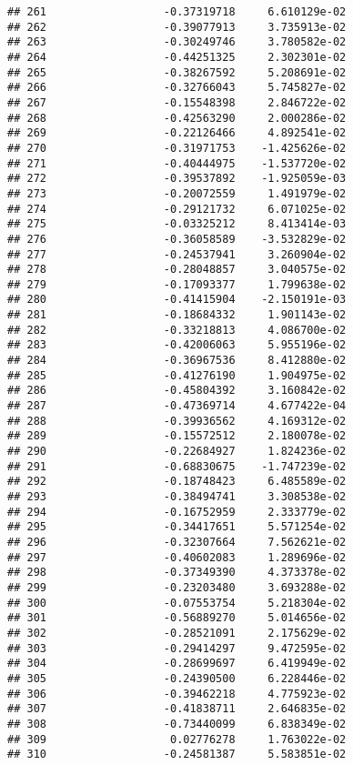 \documentclass[
]{article}
\begin{document}
\begin{verbatim}
## 261                  -0.37319718     6.610129e-02
## 262                  -0.39077913     3.735913e-02
## 263                  -0.30249746     3.780582e-02
## 264                  -0.44251325     2.302301e-02
## 265                  -0.38267592     5.208691e-02
## 266                  -0.32766043     5.745827e-02
## 267                  -0.15548398     2.846722e-02
## 268                  -0.42563290     2.000286e-02
## 269                  -0.22126466     4.892541e-02
## 270                  -0.31971753    -1.425626e-02
## 271                  -0.40444975    -1.537720e-02
## 272                  -0.39537892    -1.925059e-03
## 273                  -0.20072559     1.491979e-02
## 274                  -0.29121732     6.071025e-02
## 275                  -0.03325212     8.413414e-03
## 276                  -0.36058589    -3.532829e-02
## 277                  -0.24537941     3.260904e-02
## 278                  -0.28048857     3.040575e-02
## 279                  -0.17093377     1.799638e-02
## 280                  -0.41415904    -2.150191e-03
## 281                  -0.18684332     1.901143e-02
## 282                  -0.33218813     4.086700e-02
## 283                  -0.42006063     5.955196e-02
## 284                  -0.36967536     8.412880e-02
## 285                  -0.41276190     1.904975e-02
## 286                  -0.45804392     3.160842e-02
## 287                  -0.47369714     4.677422e-04
## 288                  -0.39936562     4.169312e-02
## 289                  -0.15572512     2.180078e-02
## 290                  -0.22684927     1.824236e-02
## 291                  -0.68830675    -1.747239e-02
## 292                  -0.18748423     6.485589e-02
## 293                  -0.38494741     3.308538e-02
## 294                  -0.16752959     2.333779e-02
## 295                  -0.34417651     5.571254e-02
## 296                  -0.32307664     7.562621e-02
## 297                  -0.40602083     1.289696e-02
## 298                  -0.37349390     4.373378e-02
## 299                  -0.23203480     3.693288e-02
## 300                  -0.07553754     5.218304e-02
## 301                  -0.56889270     5.014656e-02
## 302                  -0.28521091     2.175629e-02
## 303                  -0.29414297     9.472595e-02
## 304                  -0.28699697     6.419949e-02
## 305                  -0.24390500     6.228446e-02
## 306                  -0.39462218     4.775923e-02
## 307                  -0.41838711     2.646835e-02
## 308                  -0.73440099     6.838349e-02
## 309                   0.02776278     1.763022e-02
## 310                  -0.24581387     5.583851e-02

\end{verbatim}
\end{document}
